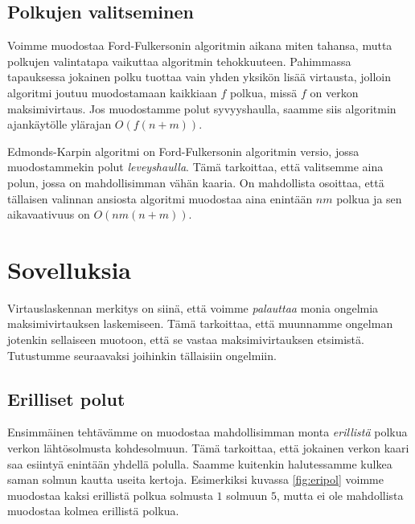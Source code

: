 \subsection{Polkujen valitseminen}

Voimme muodostaa Ford-Fulkersonin algoritmin aikana miten tahansa,
mutta polkujen valintatapa vaikuttaa algoritmin tehokkuuteen.
Pahimmassa tapauksessa jokainen polku tuottaa vain yhden yksikön
lisää virtausta, jolloin algoritmi joutuu muodostamaan kaikkiaan $f$ polkua,
missä $f$ on verkon maksimivirtaus.
Jos muodostamme polut syvyyshaulla, saamme siis algoritmin
ajankäytölle ylärajan $O(f (n+m))$.

Edmonds-Karpin algoritmi on Ford-Fulkersonin algoritmin versio,
jossa muodostammekin polut \emph{leveyshaulla}.
Tämä tarkoittaa, että valitsemme aina
polun, jossa on mahdollisimman vähän kaaria.
On mahdollista osoittaa, että tällaisen valinnan ansiosta
algoritmi muodostaa aina enintään $nm$ polkua ja
sen aikavaativuus on $O(nm (n+m))$.

\section{Sovelluksia}

Virtauslaskennan merkitys on siinä, että voimme \emph{palauttaa}
monia ongelmia maksimivirtauksen laskemiseen.
Tämä tarkoittaa, että muunnamme ongelman jotenkin
sellaiseen muotoon, että se vastaa maksimivirtauksen etsimistä.
Tutustumme seuraavaksi joihinkin tällaisiin ongelmiin.

\subsection{Erilliset polut}

Ensimmäinen tehtävämme on muodostaa mahdollisimman monta
\emph{erillistä} polkua verkon lähtösolmusta kohdesolmuun.
Tämä tarkoittaa, että jokainen verkon kaari saa esiintyä
enintään yhdellä polulla.
Saamme kuitenkin halutessamme kulkea saman solmun kautta useita kertoja.
Esimerkiksi kuvassa \ref{fig:eripol} voimme muodostaa
kaksi erillistä polkua solmusta $1$ solmuun $5$,
mutta ei ole mahdollista muodostaa kolmea erillistä polkua.

